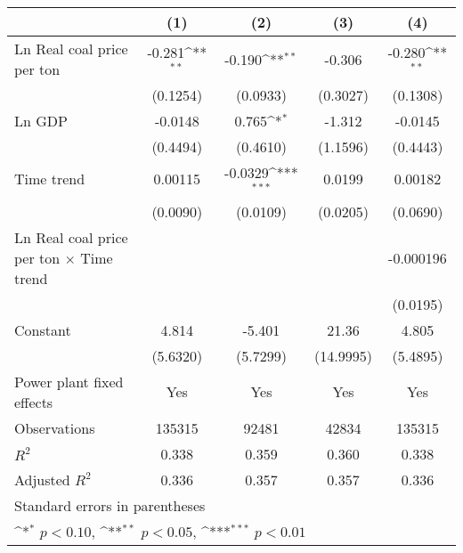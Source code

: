 {
\def\sym#1{\ifmmode^{#1}\else\(^{#1}\)\fi}
\begin{tabular}{l*{4}{c}}
\toprule
                    &\multicolumn{1}{c}{(1)}&\multicolumn{1}{c}{(2)}&\multicolumn{1}{c}{(3)}&\multicolumn{1}{c}{(4)}\\
\midrule
Ln Real coal price per ton&      -0.281\sym{**} &      -0.190\sym{**} &      -0.306         &      -0.280\sym{**} \\
                    &    (0.1254)         &    (0.0933)         &    (0.3027)         &    (0.1308)         \\
\addlinespace
Ln GDP              &     -0.0148         &       0.765\sym{*}  &      -1.312         &     -0.0145         \\
                    &    (0.4494)         &    (0.4610)         &    (1.1596)         &    (0.4443)         \\
\addlinespace
Time trend          &     0.00115         &     -0.0329\sym{***}&      0.0199         &     0.00182         \\
                    &    (0.0090)         &    (0.0109)         &    (0.0205)         &    (0.0690)         \\
\addlinespace
Ln Real coal price per ton $\times$ Time trend&                     &                     &                     &   -0.000196         \\
                    &                     &                     &                     &    (0.0195)         \\
\addlinespace
Constant            &       4.814         &      -5.401         &       21.36         &       4.805         \\
                    &    (5.6320)         &    (5.7299)         &   (14.9995)         &    (5.4895)         \\
\addlinespace
Power plant fixed effects&         Yes         &         Yes         &         Yes         &         Yes         \\
\midrule
Observations        &      135315         &       92481         &       42834         &      135315         \\
\(R^{2}\)           &       0.338         &       0.359         &       0.360         &       0.338         \\
Adjusted \(R^{2}\)  &       0.336         &       0.357         &       0.357         &       0.336         \\
\bottomrule
\multicolumn{5}{l}{\footnotesize Standard errors in parentheses}\\
\multicolumn{5}{l}{\footnotesize \sym{*} \(p<0.10\), \sym{**} \(p<0.05\), \sym{***} \(p<0.01\)}\\
\end{tabular}
}
